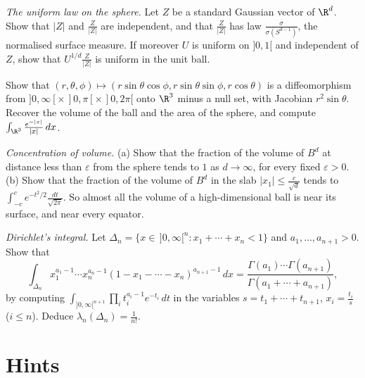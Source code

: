 \begin{exercise}[$\star\star$]\label{ex:sphere}
\emph{The uniform law on the sphere.} Let $Z$ be a standard Gaussian vector of $\R^d$. Show that $|Z|$ and $\frac Z{|Z|}$ are independent, and that $\frac Z{|Z|}$ has law $\frac\sigma{\sigma(S^{d-1})}$, the normalised
surface measure. If moreover $U$ is uniform on $]0,1[$ and independent of $Z$, show that $U^{1/d}\frac Z{|Z|}$ is uniform in the unit ball.
\end{exercise}

\begin{exercise}[$\star$]\label{ex:spherical3}
Show that $(r,\theta,\phi)\mapsto(r\sin\theta\cos\phi,r\sin\theta\sin\phi,r\cos\theta)$ is a diffeomorphism from $]0,\infty[\times\,]0,\pi[\times\,]0,2\pi[$ onto $\R^3$ minus a null set, with Jacobian
$r^2\sin\theta$. Recover the volume of the ball and the area of the sphere, and compute $\int_{\R^3}\frac{e^{-|x|}}{|x|}\,dx$.
\end{exercise}

\begin{exercise}[$\star\star$]\label{ex:shell}
\emph{Concentration of volume.} (a) Show that the fraction of the volume of $B^d$ at distance less than $\varepsilon$ from the sphere tends to $1$ as $d\to\infty$, for every fixed $\varepsilon>0$. (b) Show that
the fraction of the volume of $B^d$ in the slab $|x_1|\le\frac c{\sqrt d}$ tends to $\int_{-c}^ce^{-t^2/2}\frac{dt}{\sqrt{2\pi}}$. So almost all the volume of a high-dimensional ball is near its surface, and near
every equator.
\end{exercise}

\begin{exercise}[$\star\star\star$]\label{ex:simplex}
\emph{Dirichlet's integral.} Let $\Delta_n=\{x\in\,]0,\infty[^n:x_1+\cdots+x_n<1\}$ and $a_1,\dots,a_{n+1}>0$. Show that
\[\int_{\Delta_n}x_1^{a_1-1}\cdots x_n^{a_n-1}(1-x_1-\cdots-x_n)^{a_{n+1}-1}\,dx=\frac{\Gamma(a_1)\cdots\Gamma(a_{n+1})}{\Gamma(a_1+\cdots+a_{n+1})},\]
by computing $\int_{]0,\infty[^{n+1}}\prod_it_i^{a_i-1}e^{-t_i}\,dt$ in the variables $s=t_1+\cdots+t_{n+1}$, $x_i=\frac{t_i}s$ ($i\le n$). Deduce $\lambda_n(\Delta_n)=\frac1{n!}$.
\end{exercise}

\section{Hints}

